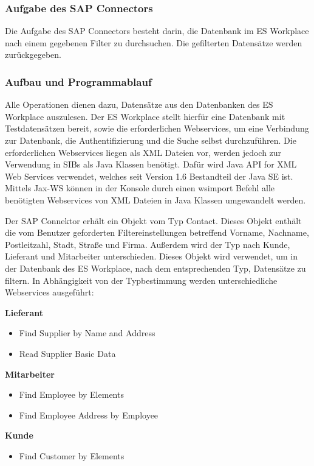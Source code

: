 \subsubsection{Aufgabe des SAP Connectors}

Die Aufgabe des SAP Connectors besteht darin, die Datenbank im ES Workplace nach einem 
gegebenen Filter zu durchsuchen. Die gefilterten Datensätze werden zurückgegeben. 

\subsubsection{Aufbau und Programmablauf}

Alle Operationen dienen dazu, Datensätze aus den Datenbanken des ES Workplace auszulesen. Der ES Workplace stellt hierfür 
eine Datenbank mit Testdatensätzen bereit, sowie die erforderlichen Webservices, um eine Verbindung zur Datenbank, 
die Authentifizierung und die Suche selbst durchzuführen. Die erforderlichen Webservices liegen als XML Dateien vor, werden 
jedoch zur Verwendung in SIBs als Java Klassen benötigt. Dafür wird Java API for XML Web Services verwendet, welches seit
Version 1.6  Bestandteil der Java SE ist. Mittels Jax-WS können in der Konsole durch einen wsimport Befehl alle benötigten 
Webservices von XML Dateien in Java Klassen umgewandelt werden. 

Der SAP Connektor erhält ein Objekt vom Typ Contact. Dieses Objekt enthält die vom Benutzer geforderten Filtereinstellungen 
betreffend Vorname, Nachname, Postleitzahl, Stadt, Straße und Firma. Außerdem wird der Typ nach Kunde, Lieferant und 
Mitarbeiter unterschieden. Dieses Objekt wird verwendet, um in der Datenbank des ES Workplace, nach dem entsprechenden Typ,
Datensätze zu filtern. In Abhängigkeit von der Typbestimmung werden unterschiedliche Webservices ausgeführt:

\textbf{Lieferant}
\begin{itemize}
\item Find Supplier by Name and Address
\item Read Supplier Basic Data 
\end{itemize}

\textbf{Mitarbeiter}
\begin{itemize}
\item Find Employee by Elements
\item Find Employee Address by Employee
\end{itemize}

\textbf{Kunde}
\begin{itemize}
\item Find Customer by Elements
\end{itemize}

